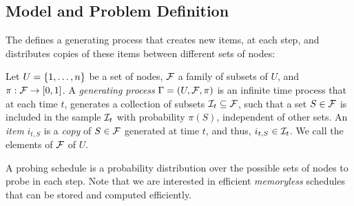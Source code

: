 \subsection{Model and Problem Definition}
The {\probname} defines a generating process that creates new items, at each step, and distributes copies of these items between different sets of nodes:

\begin{definition}
Let $U=\set{1,\ldots,n}$ be a set of nodes, $\F$ a family of subsets of $U$, and $\pi:\F \rightarrow [0,1]$. 
A \emph{generating process} $\sys = (U, \F,\pi)$ is an infinite time process that at each time $t$, generates a collection of subsets $\S_t \subseteq\F$, such that a set $S\in \F$ is included in the sample $\S_t$  with probability $\pi(S)$, independent of other sets. 
An \emph{item} $i_{t,S}$ is a \emph{copy} of $S\in\F$ generated at time $t$, and thus, $i_{t,S}\in \S_t$.
We call the elements of $\F$ \emph{\ins} of $U$.
\end{definition}

A probing schedule is a probability distribution over the possible sets of nodes to probe in each step. Note that we are interested in efficient \emph{memoryless} schedules that can be stored and computed efficiently.

